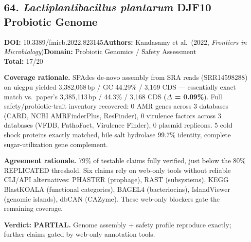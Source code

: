 \subsection{64. \textit{Lactiplantibacillus plantarum} DJF10 Probiotic Genome}
\textbf{DOI:} 10.3389/fmicb.2022.823145\quad\textbf{Authors:} Kandasamy et al.\ (2022, \textit{Frontiers in Microbiology})\quad\textbf{Domain:} Probiotic Genomics / Safety Assessment\\
\quad{}\quad\textbf{Total:} 17/20\par\smallskip
\noindent\textbf{Coverage rationale.} SPAdes de-novo assembly from SRA reads (SRR14598288) on uicgpu yielded 3{,}382{,}068\,bp / GC 44.29\% / 3{,}169 CDS — essentially exact match vs.\ paper's 3{,}385{,}113\,bp / 44.3\% / 3{,}168 CDS (\textbf{$\Delta$ = 0.09\%}). Full safety/probiotic-trait inventory recovered: 0 AMR genes across 3 databases (CARD, NCBI AMRFinderPlus, ResFinder), 0 virulence factors across 3 databases (VFDB, PathoFact, Virulence Finder), 0 plasmid replicons. 5 cold shock proteins exactly matched, bile salt hydrolase 99.7\% identity, complete sugar-utilization gene complement.\par
\noindent\textbf{Agreement rationale.} 79\% of testable claims fully verified, just below the 80\% REPLICATED threshold. Six claims rely on web-only tools without reliable CLI/API alternatives: PHASTER (prophage), RAST (subsystems), KEGG BlastKOALA (functional categories), BAGEL4 (bacteriocins), IslandViewer (genomic islands), dbCAN (CAZyme). These web-only blockers gate the remaining coverage.\par\smallskip
\noindent\textbf{Verdict: PARTIAL.} Genome assembly + safety profile reproduce exactly; further claims gated by web-only annotation tools.
